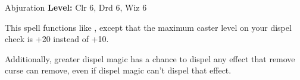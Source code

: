 {Abjuration}
{
	\textbf{Level:}
	Clr 6, Drd 6, Wiz 6\\
}
{
	This spell functions like , except that the maximum caster level on your dispel check is +20 instead of +10.

	Additionally, greater dispel magic has a chance to dispel any effect that remove curse can remove, even if dispel magic can't dispel that effect.

}
